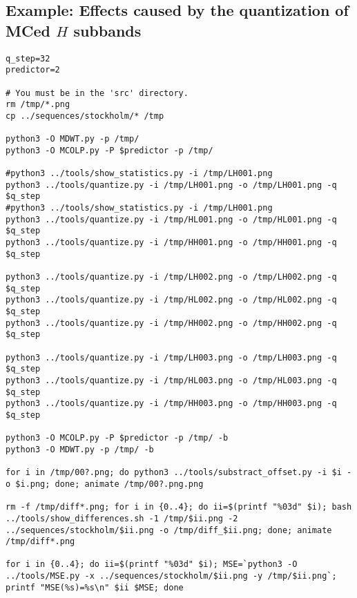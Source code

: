 \subsection*{Example: Effects caused by the quantization of MCed $H$ subbands}
\begin{verbatim}
q_step=32
predictor=2

# You must be in the 'src' directory.
rm /tmp/*.png
cp ../sequences/stockholm/* /tmp

python3 -O MDWT.py -p /tmp/
python3 -O MCOLP.py -P $predictor -p /tmp/

#python3 ../tools/show_statistics.py -i /tmp/LH001.png
python3 ../tools/quantize.py -i /tmp/LH001.png -o /tmp/LH001.png -q $q_step
#python3 ../tools/show_statistics.py -i /tmp/LH001.png
python3 ../tools/quantize.py -i /tmp/HL001.png -o /tmp/HL001.png -q $q_step
python3 ../tools/quantize.py -i /tmp/HH001.png -o /tmp/HH001.png -q $q_step

python3 ../tools/quantize.py -i /tmp/LH002.png -o /tmp/LH002.png -q $q_step
python3 ../tools/quantize.py -i /tmp/HL002.png -o /tmp/HL002.png -q $q_step
python3 ../tools/quantize.py -i /tmp/HH002.png -o /tmp/HH002.png -q $q_step

python3 ../tools/quantize.py -i /tmp/LH003.png -o /tmp/LH003.png -q $q_step
python3 ../tools/quantize.py -i /tmp/HL003.png -o /tmp/HL003.png -q $q_step
python3 ../tools/quantize.py -i /tmp/HH003.png -o /tmp/HH003.png -q $q_step

python3 -O MCOLP.py -P $predictor -p /tmp/ -b
python3 -O MDWT.py -p /tmp/ -b

for i in /tmp/00?.png; do python3 ../tools/substract_offset.py -i $i -o $i.png; done; animate /tmp/00?.png.png

rm -f /tmp/diff*.png; for i in {0..4}; do ii=$(printf "%03d" $i); bash ../tools/show_differences.sh -1 /tmp/$ii.png -2 ../sequences/stockholm/$ii.png -o /tmp/diff_$ii.png; done; animate /tmp/diff*.png

for i in {0..4}; do ii=$(printf "%03d" $i); MSE=`python3 -O ../tools/MSE.py -x ../sequences/stockholm/$ii.png -y /tmp/$ii.png`; printf "MSE(%s)=%s\n" $ii $MSE; done
\end{verbatim}

